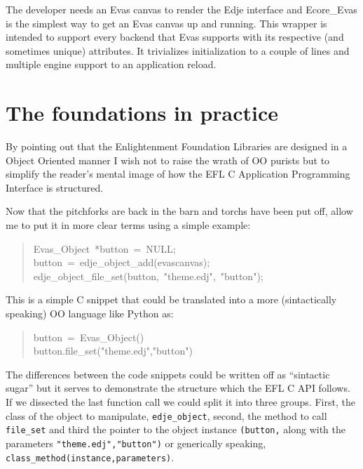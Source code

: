 \documentclass[12pt,a4paper,english]{book}
\begin{document}
The developer needs an Evas canvas to render the Edje interface and Ecore{\_}Evas
is the simplest way to get an Evas canvas up and running. This wrapper is
intended to support every backend that Evas supports with its respective (and
sometimes unique) attributes. It trivializes initialization to a couple of
lines and multiple engine support to an application reload.



\hypertarget{the-foundations-in-practice}{}
\chapter{The foundations in practice}

By pointing out that the Enlightenment Foundation Libraries are designed in a
Object Oriented manner I wish not to raise the wrath of OO purists but to
simplify the reader's mental image of how the EFL C Application Programming
Interface is structured.

Now that the pitchforks are back in the barn and torchs have been put off,
allow me to put it in more clear terms using a simple example:
\begin{quote}{\ttfamily \raggedright \noindent
Evas{\_}Object~*button~=~NULL;~\\
button~=~edje{\_}object{\_}add(evascanvas);~\\
edje{\_}object{\_}file{\_}set(button,~"theme.edj",~"button");
}\end{quote}

This is a simple C snippet that could be translated into a more (sintactically
speaking) OO language like Python as:
\begin{quote}{\ttfamily \raggedright \noindent
button~=~Evas{\_}Object()~\\
button.file{\_}set("theme.edj","button")
}\end{quote}

The differences between the code snippets could be written off as ``sintactic
sugar'' but it serves to demonstrate the structure which the EFL C API follows.
If we dissected the last function call we could split it into three groups.
First, the class of the object to manipulate, \texttt{edje{\_}object}, second, the
method to call \texttt{file{\_}set} and third the pointer to the object instance
\texttt{(button,} along with the parameters \texttt{"theme.edj","button")} or generically
speaking, \texttt{class{\_}method(instance,parameters)}.
\end{document}
